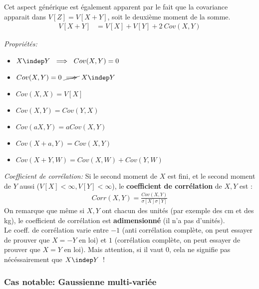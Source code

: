 \documentclass[french,twoside]{article}
\begin{document}
Cet aspect générique est également apparent par le fait que la covariance apparait dans $V[Z]=V[X+Y]$, soit le deuxième moment de la somme.
\begin{align}
V[X+Y]
&= V[X]+V[Y] + 2~Cov(X,Y)
\end{align}

\emph{Propriétés:}
\begin{itemize}
\item $X\indep Y~ \implies ~ Cov(X,Y) = 0$
\item $Cov(X,Y) = 0 ~ \cancel{\implies} ~ X \indep Y$
\item $Cov(X,X) = V[X]$
\item $Cov(X,Y) = Cov(Y,X)$
\item $Cov(aX,Y) = a Cov(X,Y)$
\item $Cov(X+a,Y) =Cov(X,Y)$
\item $Cov(X+Y,W) =Cov(X,W) + Cov(Y,W)$
\end{itemize}


\emph{Coefficient de corrélation:}
Si le second moment de $X$ est fini, et le second moment de $Y$ aussi ($V[X]< \infty, V[Y]< \infty$), le \textbf{coefficient de corrélation} de $X,Y$ est :
\begin{align}
Corr(X,Y) = \frac{Cov(X,Y)}{\sigma[X] \sigma[Y]}
\end{align}
On remarque que même si $X,Y$ ont chacun des unités (par exemple des cm et des kg), le coefficient de corrélation est \textbf{adimensionné} (il n'a pas d'unités).
\\

Le coeff. de corrélation varie entre $-1$ (anti corrélation complète, on peut essayer de prouver que $X=-Y$ en loi) et $1$ (corrélation complète, on peut essayer de prouver que $X=Y$ en loi).
Mais attention, si il vaut $0$, cela ne signifie pas nécéssairement que $X\indep Y$~!
\\

\subsubsection{Cas notable: Gaussienne multi-variée}
\end{document}
